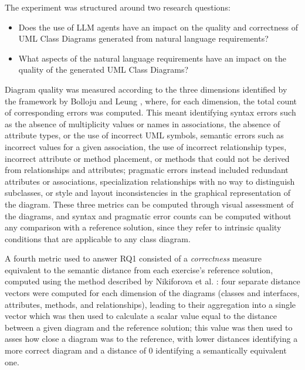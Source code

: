 The experiment was structured around two research questions:

\begin{itemize}
    \item[\textbf{RQ1:}] Does the use of LLM agents have an impact on the quality and correctness of UML Class Diagrams generated from natural language requirements?
    \item[\textbf{RQ2:}] What aspects of the natural language requirements have an impact on the quality of the generated UML Class Diagrams?
\end{itemize}

Diagram quality was measured according to the three dimensions identified by the framework by Bolloju and Leung \cite{bolloju2006assisting}, where, for each dimension, the total count of corresponding errors was computed. This meant identifying syntax errors such as the absence of multiplicity values or names in associations, the absence of attribute types, or the use of incorrect UML symbols, semantic errors such as incorrect values for a given association, the use of incorrect relationship types, incorrect attribute or method placement, or methods that could not be derived from relationships and attributes; pragmatic errors instead included redundant attributes or associations, specialization relationships with no way to distinguish subclasses, or style and layout inconsistencies in the graphical representation of the diagram. These three metrics can be computed through visual assessment of the diagrams, and syntax and pragmatic error counts can be computed without any comparison with a reference solution, since they refer to intrinsic quality conditions that are applicable to any class diagram. 

A fourth metric used to answer RQ1 consisted of a \textit{correctness} measure equivalent to the semantic distance from each exercise's reference solution, computed using the method described by Nikiforova et al. \cite{nikiforova2015approach}: four separate distance vectors were computed for each dimension of the diagrams (classes and interfaces, attributes, methods, and relationships), leading to their aggregation into a single vector which was then used to calculate a scalar value equal to the distance between a given diagram and the reference solution; this value was then used to asses how close a diagram was to the reference, with lower distances identifying a more correct diagram and a distance of 0 identifying a semantically equivalent one.

